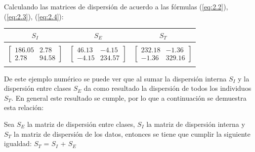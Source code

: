 Calculando las matrices de dispersión de acuerdo a las fórmulas (\ref{eq:2.2}), (\ref{eq:2.3}), (\ref{eq:2.4}):

\begin{center}
\begin{tabular}{ c c c}
\toprule
\textbf{$S_I$} & \textbf{$S_E$} & \textbf{$S_T$} \\
\midrule\\
\addlinespace[-2ex]
$ \begin{bmatrix}  186.05 & 2.78 \\ 2.78 &  94.58 \end{bmatrix}$ &
$ \begin{bmatrix} 46.13 & -4.15 \\ -4.15 & 234.57 \end{bmatrix}$ &
$ \begin{bmatrix}  232.18 & -1.36 \\ -1.36 &  329.16 \end{bmatrix}$ \\
\addlinespace[1.5ex]
\bottomrule
\end{tabular}
\end{center}

De este ejemplo numérico se puede ver que al sumar la dispersión interna $S_I$ y la dispersión entre clases $S_E$ da como resultado la dispersión de todos los individuos $S_T$. En general este resultado se cumple, por lo que a continuación se demuestra esta relación:

\pagebreak

\begin{proposition} \label{lemma2.1}
Sea $S_E$ la matriz de dispersión entre clases, $S_I$ la matriz de dispersión interna y $S_T$ la matriz de dispersión de los datos, entonces se tiene que cumplir la siguiente igualdad: $S_T$ = $S_I$ + $S_E$
\end{proposition}

